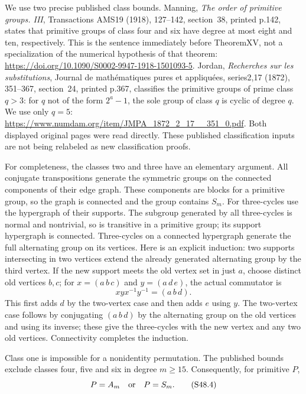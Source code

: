 We use two precise published class bounds. Manning,
\emph{The order of primitive groups. III}, Transactions AMS19
(1918), 127--142, section~38, printed p.142, states that primitive
groups of class four and six have degree at most eight and ten,
respectively. This is the sentence immediately before
TheoremXV, not a specialization of the numerical hypothesis
of that theorem:
\url{https://doi.org/10.1090/S0002-9947-1918-1501093-5}.
Jordan, \emph{Recherches sur les substitutions}, Journal de
math\'ematiques pures et appliqu\'ees, series2,17 (1872),
351--367, section~24, printed p.367, classifies the primitive groups
of prime class \(q>3\): for \(q\) not of the form
\(2^a-1\), the sole group of class \(q\) is cyclic of
degree \(q\). We use only \(q=5\):
\url{https://www.numdam.org/item/JMPA_1872_2_17__351_0.pdf}.
Both displayed original pages were read directly. These
published classification inputs are not being relabeled as
new classification proofs.

For completeness, the classes two and three have an elementary
argument. All conjugate transpositions generate the symmetric
groups on the connected components of their edge graph.
These components are blocks for a primitive group, so the graph
is connected and the group contains \(S_m\).
For three-cycles use the hypergraph of their supports.
The subgroup generated by all three-cycles is normal and
nontrivial, so is transitive in a primitive group; its support
hypergraph is connected. Three-cycles on a connected hypergraph
generate the full alternating group on its vertices. Here is
an explicit induction: two supports intersecting in two vertices
extend the already generated alternating group by the third
vertex. If the new support meets the old vertex set in just
\(a\), choose distinct old vertices \(b,c\); for
\(x=(a\,b\,c)\) and \(y=(a\,d\,e)\), the actual
commutator is
\[
                    xyx^{-1}y^{-1}=(a\,b\,d).
 \tag{S48.3}
\]
This first adds \(d\) by the two-vertex case and then adds
\(e\) using \(y\). The two-vertex case follows by
conjugating \((a\,b\,d)\) by the alternating group on
the old vertices and using its inverse; these give the
three-cycles with the new vertex and any two old vertices.
Connectivity completes the induction.

Class one is impossible for a nonidentity permutation. The
published bounds exclude classes four, five and six in degree
\(m\ge15\). Consequently, for primitive \(P\),
\[
                         P=A_m\quad\hbox{or}\quad P=S_m.
 \tag{S48.4}
\]

